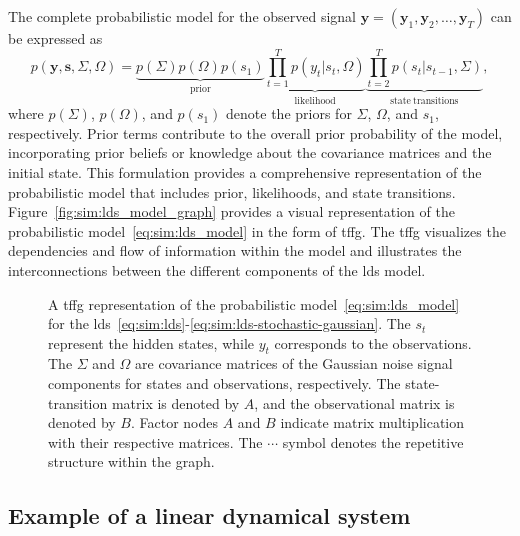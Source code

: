 The complete probabilistic model for the observed signal $\bm{y} = (\bm{y}_1,\bm{y}_2,\ldots,\bm{y}_T)$ can be expressed as \begin{equation}
  \label{eq:sim:lds_model}
  p(\bm{y}, \bm{s}, \Sigma, \Omega) =
  \underbrace{p(\Sigma)p(\Omega)p(s_1)}_{\mathrm{prior}}\underbrace{\prod_{t = 1}^{T} p(y_t\vert
    s_t, \Omega)}_{\mathrm{likelihood}}\underbrace{\prod_{t = 2}^{T}p(s_t\vert s_{t - 1},
    \Sigma)}_{\mathrm{state~transitions}},
\end{equation} where $p(\Sigma)$,
$p(\Omega)$, and $p(s_1)$ denote the priors for $\Sigma$, $\Omega$, and $s_1$, respectively.
Prior terms contribute to the overall prior probability of the model, incorporating prior
beliefs or knowledge about the covariance matrices and the initial state.
This formulation provides a comprehensive representation of the probabilistic model that
includes prior, likelihoods, and state transitions.
Figure~\eqref{fig:sim:lds_model_graph} provides a visual representation of the probabilistic
model~\eqref{eq:sim:lds_model} in the form of \ac{tffg}.
The \ac{tffg} visualizes the dependencies and flow of information within the model and illustrates
the interconnections between the different components of the \ac{lds} model.

\begin{figure}
  \centering
  \resizebox{\textwidth}{!}{}
  \caption{
    A \ac{tffg} representation of the probabilistic model~\eqref{eq:sim:lds_model} for the \ac{lds}~\eqref{eq:sim:lds}-\eqref{eq:sim:lds-stochastic-gaussian}.
    The $s_t$ represent the hidden states, while $y_t$ corresponds to the
    observations.
    The $\Sigma$ and $\Omega$ are covariance matrices of the Gaussian noise signal components for states
    and observations, respectively.
    The state-transition matrix is denoted by $A$, and the observational matrix is denoted by $B$.
    Factor nodes $A$ and $B$ indicate matrix multiplication with their respective matrices.
    The $\cdots$ symbol denotes the repetitive structure within the graph.
  }
  \label{fig:sim:lds_model_graph}
\end{figure}

\subsection{Example of a linear dynamical system}

